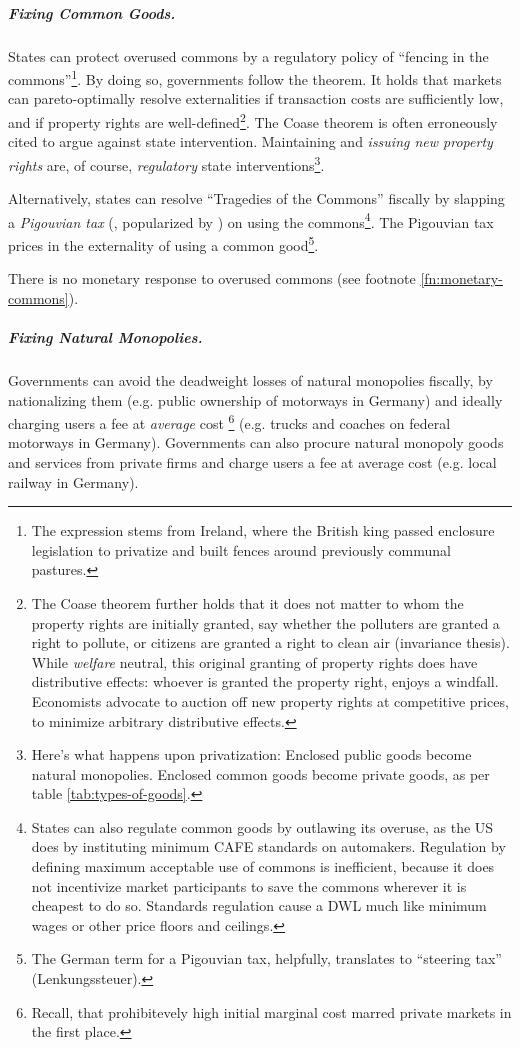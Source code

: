 \subparagraph{Fixing Common Goods.}  \label{sec:commongoodresponse} States can protect overused commons by a regulatory policy of ``fencing in the commons''\footnote{
	The expression stems from Ireland, where the British king passed enclosure legislation to privatize and built fences around previously communal pastures.}. 
By doing so, governments follow the \cite{Coase1960} theorem. It holds that markets can pareto-optimally resolve externalities if transaction costs are sufficiently low, and if property rights are well-defined\footnote{
	The Coase theorem further holds that it does not matter to whom the property rights are initially granted, say whether the polluters are granted a right to pollute, or citizens are granted a right to clean air (invariance thesis). While \emph{welfare} neutral, this original granting of property rights does have distributive effects: whoever is granted the property right, enjoys a windfall. Economists advocate to auction off new property rights at competitive prices, to minimize arbitrary distributive effects.}.%
The Coase theorem is often erroneously cited to argue against state intervention. Maintaining and \emph{issuing new property rights} are, of course, \emph{regulatory} state interventions\footnote{
	Here's what happens upon privatization: Enclosed public goods become natural monopolies. Enclosed common goods become private goods, as per table \ref{tab:types-of-goods}.}.

Alternatively, states can resolve ``Tragedies of the Commons'' \citep{Hardin-1968-aa} fiscally by slapping a \emph{Pigouvian tax} (\citealt{Pigou1912}, popularized by \citealt{Baumol1972}) on using the commons\footnote{
	States can also regulate common goods by outlawing its overuse, as the US does by instituting minimum \gls{CAFE} standards on automakers. Regulation by defining maximum acceptable use of commons is inefficient, because it does not incentivize market participants to save the commons wherever it is cheapest to do so. Standards regulation cause a \gls{DWL} much like minimum wages or other price floors and ceilings.}. 
The Pigouvian tax prices in the externality of using a common good\footnote{
	The German term for a Pigouvian tax, helpfully, translates to ``steering tax'' (Lenkungssteuer).}. 

There is no monetary response to overused commons (see footnote \ref{fn:monetary-commons}).

\subparagraph{Fixing Natural Monopolies.}  \label{sec:natural-monopoly-response} Governments can avoid the deadweight losses of natural monopolies fiscally, by nationalizing them (e.g. public ownership of motorways in Germany) and ideally charging users a fee at \emph{average} cost
\footnote{
\label{fn:why-ac-fees}
	Recall, that prohibitevely high initial marginal cost marred private markets in the first place.
} 
(e.g. trucks and coaches on federal motorways in Germany). Governments can also procure natural monopoly goods and services from private firms and charge users a fee at average cost (e.g. local railway in Germany).
		
